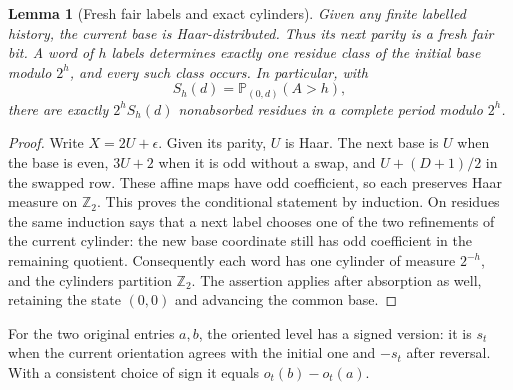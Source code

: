 \documentclass[11pt]{amsart}
\newtheorem{lemma}[theorem]{Lemma}
\theoremstyle{definition}
\theoremstyle{remark}
\newcommand{\PP}{\mathbb P}
\newcommand{\Ztwo}{\mathbb Z_2}
\begin{document}
\begin{lemma}[Fresh fair labels and exact cylinders]\label{pair:cylinders}
Given any finite labelled history, the current base is Haar-distributed.
Thus its next parity is a fresh fair bit.  A word of $h$ labels determines
exactly one residue class of the initial base modulo $2^h$, and every such
class occurs.  In particular, with
\[
 S_h(d)=\PP_{(0,d)}(A>h),
\]
there are exactly $2^h S_h(d)$ nonabsorbed residues in a complete period
modulo $2^h$.
\end{lemma}
\begin{proof}
Write $X=2U+\epsilon$.  Given its parity, $U$ is Haar.  The next base is
$U$ when the base is even, $3U+2$ when it is odd without a swap, and
$U+(D+1)/2$ in the swapped row.  These affine maps have odd coefficient,
so each preserves Haar measure on $\Ztwo$.  This proves the conditional
statement by induction.  On residues the same induction says that a next
label chooses one of the two refinements of the current cylinder: the
new base coordinate still has odd coefficient in the remaining quotient.
Consequently each word has one cylinder of measure $2^{-h}$, and the
cylinders partition $\Ztwo$.  The assertion applies after absorption as
well, retaining the state $(0,0)$ and advancing the common base.
\end{proof}

For the two original entries $a,b$, the oriented level has a signed version:
it is $s_t$ when the current orientation agrees with the initial one and
$-s_t$ after reversal.  With a consistent choice of sign it equals
$o_t(b)-o_t(a)$.
\end{document}
